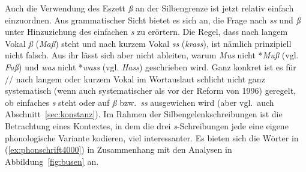 Auch die Verwendung des Eszett \textit{ß} an der Silbengrenze ist jetzt relativ einfach einzuordnen.
Aus grammatischer Sicht bietet es sich an, die Frage nach \textit{ss} und \textit{ß} unter Hinzuziehung des einfachen \textit{s} zu erörtern.
Die Regel, dass nach langem Vokal \textit{ß} (\textit{Maß}) steht und nach kurzem Vokal \textit{ss} (\textit{krass}), ist nämlich prinzipiell nicht falsch.
Aus ihr lässt sich aber nicht ableiten, warum \zB \textit{Mus} nicht *\textit{Muß} (vgl. \textit{Fuß}) und \textit{was} nicht *\textit{wass} (vgl. \textit{Hass}) geschrieben wird.
Ganz konkret ist es für // nach langem oder kurzem Vokal im Wortauslaut schlicht nicht ganz systematisch (wenn auch systematischer als vor der Reform von 1996) geregelt, ob einfaches \textit{s} steht oder auf \textit{ß} bzw.\ \textit{ss} ausgewichen wird (aber vgl.\ auch Abschnitt~\ref{sec:konstanz}).
Im Rahmen der Silbengelenkschreibungen ist die Betrachtung eines Kontextes, in dem die drei \textit{s}-Schreibungen jede eine eigene phonologische Variante kodieren, viel interessanter.
Es bieten sich die Wörter in (\ref{ex:phonschrift4000}) in Zusammenhang mit den Analysen in Abbildung~\ref{fig:busen} an.

\begin{exe}
  \ex\label{ex:phonschrift4000} 
  \begin{xlist}
  \end{xlist}
\end{exe}

